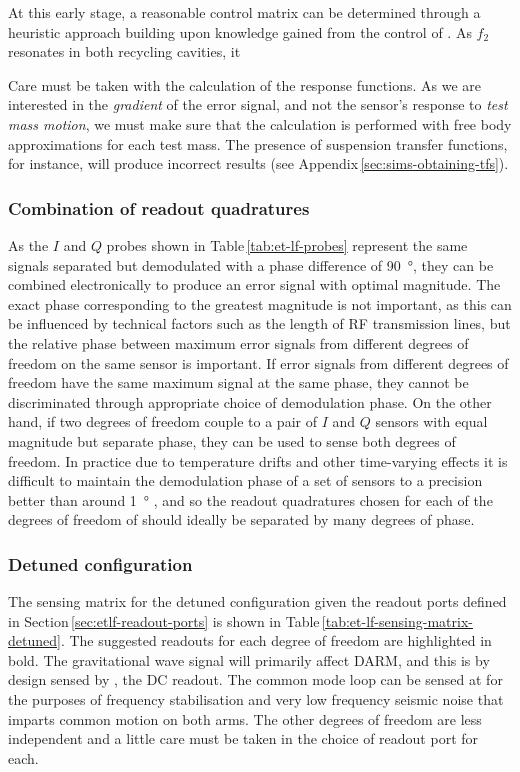 At this early stage, a reasonable control matrix can be determined through a heuristic approach building upon knowledge gained from the control of \ALIGO{}. As $f_2$ resonates in both recycling cavities, it 

Care must be taken with the calculation of the response functions. As we are interested in the \emph{gradient} of the error signal, and not the sensor's response to \emph{test mass motion}, we must make sure that the calculation is performed with free body approximations for each test mass. The presence of suspension transfer functions, for instance, will produce incorrect results (see Appendix\,\ref{sec:sims-obtaining-tfs}).

\subsubsection{Combination of readout quadratures}
As the $I$ and $Q$ probes shown in Table\,\ref{tab:et-lf-probes} represent the same signals separated but demodulated with a phase difference of \SI{90}{\degree}, they can be combined electronically to produce an error signal with optimal magnitude. The exact phase corresponding to the greatest magnitude is not important, as this can be influenced by technical factors such as the length of \gls{RF} transmission lines, but the relative phase between maximum error signals from different degrees of freedom on the same sensor is important. If error signals from different degrees of freedom have the same maximum signal at the same phase, they cannot be discriminated through appropriate choice of demodulation phase. On the other hand, if two degrees of freedom couple to a pair of $I$ and $Q$ sensors with equal magnitude but separate phase, they can be used to sense both degrees of freedom. In practice due to temperature drifts and other time-varying effects it is difficult to maintain the demodulation phase of a set of sensors to a precision better than around \SI{1}{\degree} \cite{Effler2014}, and so the readout quadratures chosen for each of the degrees of freedom of \ETLF{} should ideally be separated by many degrees of phase.

\subsubsection{Detuned configuration}
The sensing matrix for the detuned configuration given the readout ports defined in Section\,\ref{sec:etlf-readout-ports} is shown in Table\,\ref{tab:et-lf-sensing-matrix-detuned}. The suggested readouts for each degree of freedom are highlighted in bold. The gravitational wave signal will primarily affect \gls{DARM}, and this is by design sensed by \ASDC{}, the \gls{DC} readout. The common mode loop can be sensed at \REFLFIRSTQ{} for the purposes of frequency stabilisation and very low frequency seismic noise that imparts common motion on both arms. The other degrees of freedom are less independent and a little care must be taken in the choice of readout port for each.


